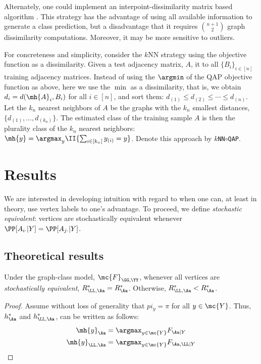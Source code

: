 \documentclass[10pt,journal,cspaper,compsoc]{IEEEtran}
\begin{document}
Alternately, one could implement an interpoint-dissimilarity matrix based algorithm \cite{Duin2011}. This strategy has the advantage of using all available information to generate a class prediction, but a disadvantage that it requires $\binom{n+1}{2}$ graph dissimilarity computations. Moreover, it may be more sensitive to outliers.

For concreteness and simplicity, consider the $k$NN strategy using the \qap objective function as a dissimilarity.  Given a test adjacency matrix, $A$, \qap it to all $\{B_i\}_{i \in [n]}$ training adjacency matrices.  Instead of using the $\argmin$ of the QAP objective function as above, here we use the $\min$ as a dissimilarity, that is, we obtain $d_i=d(\mh{A}_i,B_i)$ for all $i \in [n]$, and sort them: $d_{(1)} \leq d_{(2)} \leq \cdots \leq d_{(n)}$.  Let the $k_n$ nearest neighbors of $A$ be the graphs with the $k_n$ smallest distances, $\{d_{(1)},\ldots, d_{(k_n)}\}$.  The estimated class of the training sample $A$ is then the plurality class of the $k_n$ nearest neighbors: $\mh{y}=\argmax_{y} \II\{\sum_{i \in [k_n]} y_{(i)} = y \}$. Denote this approach by $k$\texttt{NN}$\circ$\texttt{QAP}.








\section{Results}
\label{sec:results}

We are interested in developing intuition with regard to when one can, at least in theory, use vertex labels to one's advantage.  To proceed, we define \emph{stochastic equivalent}: vertices are stochastically equivalent whenever $\PP[A_{i\cdot} | Y]=\PP[A_{j\cdot} | Y]$.


\subsection{Theoretical results} %
\label{sub:when_to_use_what}



\begin{thm}
	Under the graph-class model, $\mc{F}_{\GG,\YY}$, whenever all vertices are \emph{stochastically equivalent}, $R_{\LL,\Aa}^* = R_{\Aa}^*$.  Otherwise, $R_{\LL,\Aa}^* < R_{\Aa}^*$.
\end{thm} 
\begin{proof}
	Assume without loss of generality that $pi_y=\pi$ for all $y \in \mc{Y}$. Thus, $h_{\Aa}^*$ and $h_{\LL, \Aa}^*$, can be written as follows:
	\begin{align}
		\mh{y}_{\Aa}&=\argmax_{y\in\mc{Y}} F_{\Aa | Y}\\
		\mh{y}_{\LL,\Aa}&=\argmax_{y \in \mc{Y}} F_{\Aa, \LL| Y}
	\end{align}
\end{proof}
\end{document}

